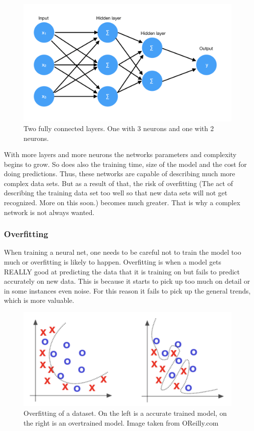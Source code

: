 \begin{figure}[hbtp]
\begin{center}
\includegraphics[width = 1.0\textwidth]{./Images/fully_connected.jpg} 
\caption{Two fully connected layers. One with 3 neurons and one with 2 neurons.}
\end{center}
\end{figure}

With more layers and more neurons the networks parameters and complexity begins to grow. So does also the training time, size of the model and the cost for doing predictions. Thus, these networks are capable of describing much more complex data sets. But as a result of that, the risk of overfitting (The act of describing the training data set too well so that new data sets will not get recognized. More on this soon.) becomes much greater. That is why a complex network is not always wanted.

\subsubsection{Overfitting}
When training a neural net, one needs to be careful not to train the model too much or overfitting is likely to happen. Overfitting is when a model gets REALLY good at predicting the data that it is training on but fails to predict accurately on new data. This is because it starts to pick up too much on detail or in some instances even noise. For this reason it fails to pick up the general trends, which is more valuable. 

\begin{figure}[hbtp]
\begin{center}
\includegraphics[width = 1.0\textwidth]{./Images/overfitting.jpg} 
\caption{Overfitting of a dataset. On the left is a accurate trained model, on the right is an overtrained model. Image taken from OReilly.com}
\end{center}
\end{figure}

